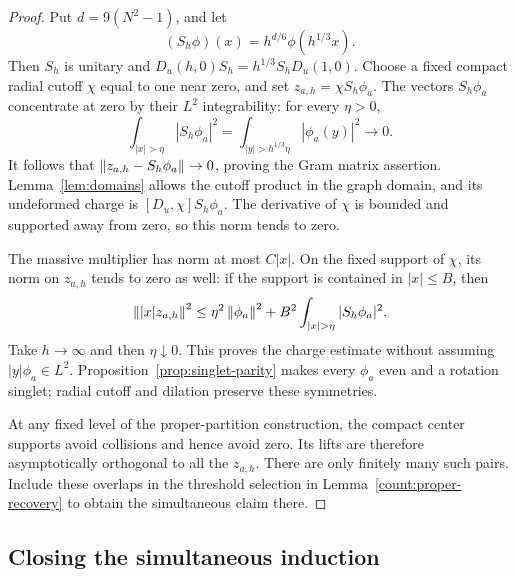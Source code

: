 \begin{proof}
Put \(d=9(N^2-1)\), and let
\[
 (S_h\phi)(x)=h^{d/6}\phi(h^{1/3}x).
\]
Then \(S_h\) is unitary and
\(D_u(h,0)S_h=h^{1/3}S_hD_u(1,0)\). Choose a fixed compact radial cutoff
\(\chi\) equal to one near zero, and set \(z_{a,h}=\chi S_h\phi_a\).
The vectors \(S_h\phi_a\) concentrate at zero by their \(L^2\) integrability:
for every \(\eta>0\),
\[
 \int_{|x|>\eta}|S_h\phi_a|^2
                  =\int_{|y|>h^{1/3}\eta}|\phi_a(y)|^2\longrightarrow0.
\]
It follows that \(\left\lVert z_{a,h}-S_h\phi_a\right\rVert\to0\), proving the Gram
matrix assertion. Lemma~\ref{lem:domains} allows the cutoff product in
the graph domain, and its undeformed charge is
\([D_u,\chi]S_h\phi_a\). The derivative of \(\chi\) is bounded and
supported away from zero, so this norm tends to zero.

The massive multiplier has norm at most \(C|x|\). On the fixed support
of \(\chi\), its norm on \(z_{a,h}\) tends to zero as well: if the support
is contained in \(|x|\le B\), then
\[
 \norm{|x|z_{a,h}}^2
 \le\eta^2\norm{\phi_a}^2+
                   B^2\int_{|x|>\eta}|S_h\phi_a|^2.
\]
Take \(h\to\infty\) and then \(\eta\downarrow0\). This proves the
charge estimate without assuming \(|y|\phi_a\in L^2\).
Proposition~\ref{prop:singlet-parity} makes every \(\phi_a\) even and a
rotation singlet; radial cutoff and dilation preserve these symmetries.

At any fixed level of the proper-partition construction, the compact
center supports avoid collisions and hence avoid zero. Its lifts are
therefore asymptotically orthogonal to all the \(z_{a,h}\). There are
only finitely many such pairs. Include these overlaps in the threshold
selection in Lemma~\ref{count:proper-recovery} to obtain the simultaneous
claim there.
\end{proof}

\subsection{Closing the simultaneous induction}

